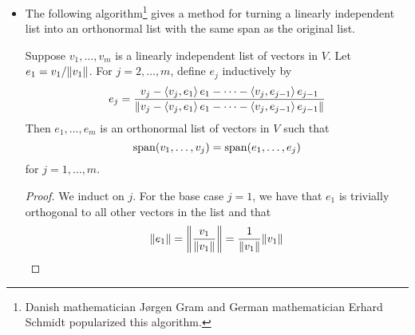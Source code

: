 \documentclass[../main.tex]{subfiles}
\begin{document}
\begin{itemize}
\begin{theorem}
\begin{proof}
            \begin{equation*}
                v = a_1e_1+\cdots+a_ne_n
            \end{equation*}
            for some $a_1,\dots,a_n\in\F$. It follows by taking inner products with an arbitrary $e_j$ that
            \begin{align*}
                \inp{v}{e_j} &= \inp{a_1e_1+\cdots+a_ne_n}{e_j}\\
                &= a_1\inp{e_1}{e_j}+\cdots+a_n\inp{e_n}{e_j}\\
                &= a_1\cdot 0+\cdots+a_{j-1}\cdot 0+a_j\cdot 1+a_{j+1}\cdot 0+\cdots+a_n\cdot 0\\
                &= a_j
            \end{align*}
            for each $j=1,\dots,n$.\par
            The second equation follows from the first equation by Theorem \ref{trm:normOrthoLnlComb}.
        \end{proof}
    \end{theorem}
    \item The following algorithm\footnote{Danish mathematician J\o rgen Gram and German mathematician Erhard Schmidt popularized this algorithm.} gives a method for turning a linearly independent list into an orthonormal list with the same span as the original list.
    \begin{theorem}\label{trm:GramSchmidt}
        Suppose $v_1,\dots,v_m$ is a linearly independent list of vectors in $V$. Let $e_1=v_1/\norm{v_1}$. For $j=2,\dots,m$, define $e_j$ inductively by
        \begin{equation*}
            e_j = \frac{v_j-\left\langle{v_j},{e_1}\right\rangle e_1-\cdots-\left\langle{v_j},{e_{j-1}}\right\rangle e_{j-1}}{\norm{v_j-\left\langle{v_j},{e_1}\right\rangle e_1-\cdots-\left\langle{v_j},{e_{j-1}}\right\rangle e_{j-1}}}
        \end{equation*}
        Then $e_1,\dots,e_m$ is an orthonormal list of vectors in $V$ such that
        \begin{equation*}
            \operatorname{span}(v_1,\dots,v_j) = \operatorname{span}(e_1,\dots,e_j)
        \end{equation*}
        for $j=1,\dots,m$.
        \begin{proof}
            We induct on $j$. For the base case $j=1$, we have that $e_1$ is trivially orthogonal to all other vectors in the list and that
            \begin{equation*}
                \norm{e_1} = \norm{\frac{v_1}{\norm{v_1}}}
                = \frac{1}{\norm{v_1}}\norm{v_1}

\end{equation*}
\end{proof}
\end{theorem}
\end{itemize}
\end{document}

